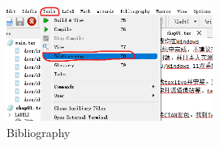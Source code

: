\begin{figure}[H] 
	\centering
	\includegraphics[width=0.6\textwidth]{image/chap01/f8.png}
	\caption{Bibliography}
	\label{fig:f8}
\end{figure}